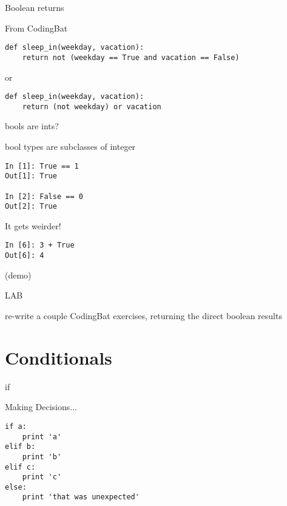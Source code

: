 \documentclass{beamer}
\begin{document}
\begin{frame}[fragile]{Boolean returns}

{\Large From CodingBat}


\begin{verbatim}
def sleep_in(weekday, vacation):
    return not (weekday == True and vacation == False)
\end{verbatim}

or

\begin{verbatim}
def sleep_in(weekday, vacation):
    return (not weekday) or vacation
\end{verbatim}


\end{frame}


\begin{frame}[fragile]{bools are ints?}

{\Large bool types are subclasses of integer}

\begin{verbatim}
In [1]: True == 1
Out[1]: True

In [2]: False == 0
Out[2]: True  
\end{verbatim}

{\Large It gets weirder! }

\begin{verbatim}
In [6]: 3 + True
Out[6]: 4
\end{verbatim}

(demo)

\end{frame}


\begin{frame}{LAB}

\vfill
{\large re-write a couple CodingBat exercises, returning the direct boolean results}
\vfill

\end{frame}

\section{Conditionals}

\begin{frame}[fragile]{if}

{\Large Making Decisions...}
\begin{verbatim}
if a:
    print 'a'
elif b:
    print 'b'
elif c:
    print 'c'
else:
    print 'that was unexpected'
\end{verbatim}

\end{frame}
\end{document}
